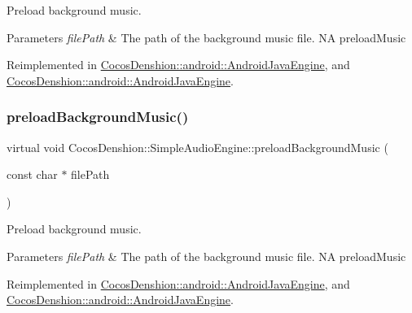 Preload background music.


\begin{DoxyParams}{Parameters}
{\em file\+Path} & The path of the background music file.  NA  preload\+Music \\
\hline
\end{DoxyParams}


Reimplemented in \hyperlink{classCocosDenshion_1_1android_1_1AndroidJavaEngine_afa06edc30986b357a9bb65f053260af0}{Cocos\+Denshion\+::android\+::\+Android\+Java\+Engine}, and \hyperlink{classCocosDenshion_1_1android_1_1AndroidJavaEngine_af7e9de02572a200bdc590e1efa731688}{Cocos\+Denshion\+::android\+::\+Android\+Java\+Engine}.

\mbox{\label{classCocosDenshion_1_1SimpleAudioEngine_aef5c525d1003459cf339053ec3101a24}} 
\subsubsection{\texorpdfstring{preload\+Background\+Music()}{preloadBackgroundMusic()}\hspace{0.1cm}{\footnotesize\ttfamily [2/2]}}
{\footnotesize\ttfamily virtual void Cocos\+Denshion\+::\+Simple\+Audio\+Engine\+::preload\+Background\+Music (\begin{DoxyParamCaption}\item[{const char $\ast$}]{file\+Path }\end{DoxyParamCaption})\hspace{0.3cm}{\ttfamily [virtual]}}

Preload background music.


\begin{DoxyParams}{Parameters}
{\em file\+Path} & The path of the background music file.  NA  preload\+Music \\
\hline
\end{DoxyParams}


Reimplemented in \hyperlink{classCocosDenshion_1_1android_1_1AndroidJavaEngine_afa06edc30986b357a9bb65f053260af0}{Cocos\+Denshion\+::android\+::\+Android\+Java\+Engine}, and \hyperlink{classCocosDenshion_1_1android_1_1AndroidJavaEngine_af7e9de02572a200bdc590e1efa731688}{Cocos\+Denshion\+::android\+::\+Android\+Java\+Engine}.

